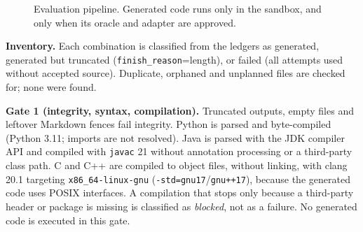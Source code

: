 \documentclass[conference]{IEEEtran}
\begin{document}
\begin{figure}[t]
\centering
{}
\caption{Evaluation pipeline. Generated code runs only in the sandbox, and only
when its oracle and adapter are approved.}
\label{fig:pipeline}
\end{figure}

\textbf{Inventory.} Each combination is classified from the ledgers as
generated, generated but truncated (\texttt{finish\_reason}=length), or failed
(all attempts used without accepted source). Duplicate, orphaned and unplanned
files are checked for; none were found.

\textbf{Gate 1 (integrity, syntax, compilation).} Truncated outputs, empty files
and leftover Markdown fences fail integrity. Python is parsed and byte-compiled
(Python 3.11; imports are not resolved). Java is parsed with the JDK compiler
API and compiled with \texttt{javac} 21 without annotation processing or a
third-party class path. C and C++ are compiled to object files, without
linking, with clang 20.1 targeting \texttt{x86\_64-linux-gnu}
(\texttt{-std=gnu17}/\texttt{gnu++17}), because the generated code uses POSIX
interfaces. A compilation that stops only because a third-party header or
package is missing is classified as \emph{blocked}, not as a failure. No
generated code is executed in this gate.
\end{document}
